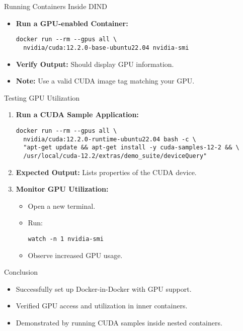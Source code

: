 \documentclass{beamer}
\begin{document}
\begin{frame}[fragile]{Running Containers Inside DIND}
    \begin{itemize}
        \item \textbf{Run a GPU-enabled Container:}
        \begin{verbatim}
docker run --rm --gpus all \
  nvidia/cuda:12.2.0-base-ubuntu22.04 nvidia-smi
        \end{verbatim}
        \item \textbf{Verify Output:} Should display GPU information.
        \item \textbf{Note:} Use a valid CUDA image tag matching your GPU.
    \end{itemize}
\end{frame}

\begin{frame}[fragile]{Testing GPU Utilization}
    \begin{enumerate}
        \item \textbf{Run a CUDA Sample Application:}
        \begin{verbatim}
docker run --rm --gpus all \
  nvidia/cuda:12.2.0-runtime-ubuntu22.04 bash -c \
  "apt-get update && apt-get install -y cuda-samples-12-2 && \
  /usr/local/cuda-12.2/extras/demo_suite/deviceQuery"
        \end{verbatim}
        \item \textbf{Expected Output:} Lists properties of the CUDA device.
        \item \textbf{Monitor GPU Utilization:}
        \begin{itemize}
            \item Open a new terminal.
            \item Run:
            \begin{verbatim}
watch -n 1 nvidia-smi
            \end{verbatim}
            \item Observe increased GPU usage.
        \end{itemize}
    \end{enumerate}
\end{frame}

\begin{frame}{Conclusion}
    \begin{itemize}
        \item Successfully set up Docker-in-Docker with GPU support.
        \item Verified GPU access and utilization in inner containers.
        \item Demonstrated by running CUDA samples inside nested containers.
    \end{itemize}
\end{frame}
\end{document}
